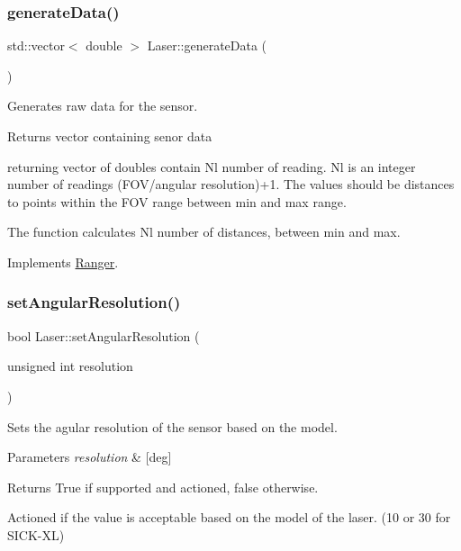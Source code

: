 \subsubsection{\texorpdfstring{generate\+Data()}{generateData()}}
{\footnotesize\ttfamily std\+::vector$<$ double $>$ Laser\+::generate\+Data (\begin{DoxyParamCaption}{ }\end{DoxyParamCaption})\hspace{0.3cm}{\ttfamily [virtual]}}



Generates raw data for the sensor. 

\begin{DoxyReturn}{Returns}
vector containing senor data
\end{DoxyReturn}
returning vector of doubles contain \textquotesingle{}Nl\textquotesingle{} number of reading. \textquotesingle{}Nl\textquotesingle{} is an integer number of readings (F\+O\+V/angular resolution)+1. The values should be distances to points within the F\+OV range between min and max range.

The function calculates Nl number of distances, between min and max. 

Implements \hyperlink{classRanger_a1ac4a84f251b0793fc262643080f084a}{Ranger}.

\mbox{\label{classLaser_a518ac84d4631b1550330d664e161ca0a}} 
\subsubsection{\texorpdfstring{set\+Angular\+Resolution()}{setAngularResolution()}}
{\footnotesize\ttfamily bool Laser\+::set\+Angular\+Resolution (\begin{DoxyParamCaption}\item[{unsigned int}]{resolution }\end{DoxyParamCaption})\hspace{0.3cm}{\ttfamily [virtual]}}



Sets the agular resolution of the sensor based on the model. 


\begin{DoxyParams}{Parameters}
{\em resolution} & \mbox{[}deg\mbox{]} \\
\hline
\end{DoxyParams}
\begin{DoxyReturn}{Returns}
True if supported and actioned, false otherwise.
\end{DoxyReturn}
Actioned if the value is acceptable based on the model of the laser. (10 or 30 for S\+I\+C\+K-\/\+XL) 

